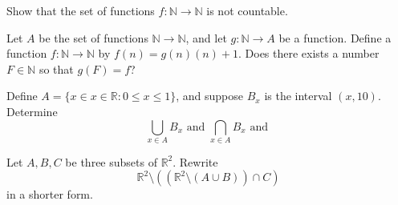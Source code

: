 \documentclass[12pt]{midterm}
\begin{document}
\begin{exam}
\begin{solution}\begin{solutiontext}
\end{solutiontext}\end{solution}


\begin{problem}[350]
  Show that the set of functions $f : \mathbb{N} \to \mathbb{N}$ is
  not countable.
\end{problem}

\begin{solution}\begin{solutiontext}
\end{solutiontext}\end{solution}

\begin{problem}[350]
  Let $A$ be the set of functions $\mathbb{N} \to \mathbb{N}$, and let
  $g : \mathbb{N} \to A$ be a function.  Define a function $f :
  \mathbb{N} \to \mathbb{N}$ by $f(n) = g(n)\left( n \right) + 1$.
  Does there exists a number $F \in \mathbb{N}$ so that $g(F) = f$?
\end{problem}

\begin{solution}\begin{solutiontext}


\end{solutiontext}\end{solution}

\begin{problem}[350]
  Define $A = \{ x \in x \in \mathbb{R} : 0 \leq x \leq 1 \}$, and
  suppose $B_x$ is the interval $(x,10)$.  Determine
$$
\bigcup_{x \in A} B_x \mbox{ and } \bigcap_{x \in A} B_x \mbox{ and }
$$

\end{problem}

\begin{solution}\begin{solutiontext}
\end{solutiontext}\end{solution}

\begin{problem}[350]
Let $A, B, C$ be three subsets of $\mathbb{R}^2$.  Rewrite
$$
\mathbb{R}^2 \setminus ((\mathbb{R}^2 \setminus (A \cup B)) \cap C)
$$
in a shorter form.
\end{problem}


\end{exam}
\end{document}
